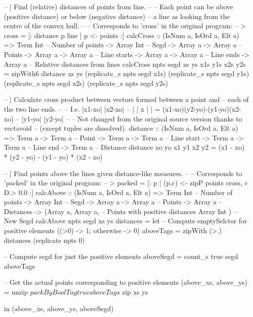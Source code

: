 \documentclass[preamble.tex]{subfiles}
\begin{document}
\clearpage
\begin{hscode}

-- | Find (relative) distances of points from line.
--
-- Each point can be above (positive distance) or below (negative distance)
-- a line as looking from the centre of the convex hull.
--
-- Corresponds to 'cross' in the original program:
-- > cross  = [: distance p line | p <- points :]
calcCross :: (IsNum a, IsOrd a, Elt a)
          => Term Int            -- Number of points
          -> Array Int           -- Segd
          -> Array a -> Array a  -- Points
          -> Array a -> Array a  -- Line starts
          -> Array a -> Array a  -- Line ends
          -> Array a             -- Relative distances from lines
calcCross npts segd xs ys x1s y1s x2s y2s
  = zipWith6 distance xs
                      ys
                      (replicate_s npts segd x1s)
                      (replicate_s npts segd y1s)
                      (replicate_s npts segd x2s)
                      (replicate_s npts segd y2s)



-- | Calculate cross product between vectors formed between a point and
--   each of the two line ends.
--
-- I.e. |x1-xo|   |x2-xo|
--      |     | x |     | = (x1-xo)(y2-yo)-(y1-yo)(x2-xo)
--      |y1-yo|   |y2-yo|
--
-- Not changed from the original source version thanks to vectavoid
-- (except tuples are dissolved).
distance :: (IsNum a, IsOrd a, Elt a)
         => Term a -> Term a  -- Point
         -> Term a -> Term a  -- Line start
         -> Term a -> Term a  -- Line end
         -> Term a            -- Distance
distance xo yo x1 y1 x2 y2
  = (x1 - xo) * (y2 - yo) - (y1 - yo) * (x2 - xo)

\end{hscode}


\clearpage
\begin{hscode}
-- | Find points above the lines given distance-like measures.
--
-- Corresponds to 'packed' in the original program:
-- > packed = [: p | (p,c) <- zipP points cross, c D.> 0.0 :]
calcAbove :: (IsNum a, IsOrd a, Elt a)
          => Term Int            -- Number of points
          -> Array Int           -- Segd
          -> Array a -> Array a  -- Points
          -> Array a             -- Distances
          -> (Array a, Array a,  -- Points with positive distances
              Array Int       )  -- New Segd
calcAbove npts segd xs ys distances
  = let -- Compute emptySelctor for positive elements ((>0) -> 1; otherwise -> 0)
        aboveTags  = zipWith (>.) distances (replicate npts 0)

        -- Compute segd for just the positive elements
        aboveSegd = count_s true segd aboveTags

        -- Get the actual points corresponding to positive elements
        (above_xs, above_ys)
                  = unzip
                  $ packByBoolTag true aboveTags
                  $ zip xs ys
 
    in  (above_xs, above_ys, aboveSegd)

\end{hscode}
\end{document}
